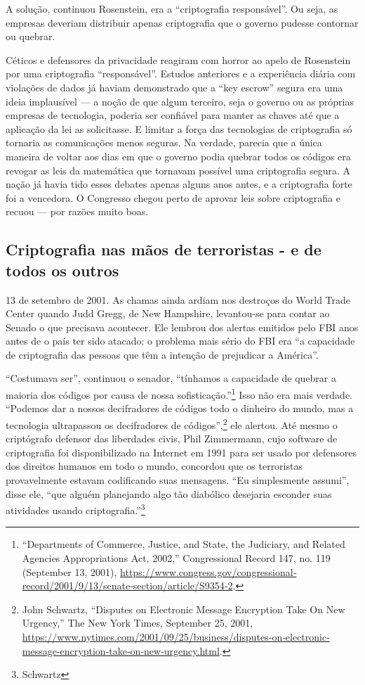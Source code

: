\documentclass{book}
\begin{document}
A solução, continuou Rosenstein, era a ``criptografia responsável''. Ou seja, as empresas deveriam distribuir apenas criptografia que o governo pudesse contornar ou quebrar.

Céticos e defensores da privacidade reagiram com horror ao apelo de Rosenstein por uma criptografia ``responsável''. Estudos anteriores e a experiência diária com violações de dados já haviam demonstrado que a ``key escrow'' segura era uma ideia implausível --- a noção de que algum terceiro, seja o governo ou as próprias empresas de tecnologia, poderia ser confiável para manter as chaves até que a aplicação da lei as solicitasse. E limitar a força das tecnologias de criptografia só tornaria as comunicações menos seguras. Na verdade, parecia que a única maneira de voltar aos dias em que o governo podia quebrar todos os códigos era revogar as leis da matemática que tornavam possível uma criptografia segura. A nação já havia tido esses debates apenas alguns anos antes, e a criptografia forte foi a vencedora. O Congresso chegou perto de aprovar leis sobre criptografia e recuou --- por razões muito boas.


\subsection{Criptografia nas mãos de terroristas - e de todos os outros}
\label{segredos:criptografia}

13 de setembro de 2001. As chamas ainda ardiam nos destroços do World Trade Center quando Judd Gregg, de New Hampshire, levantou-se para contar ao Senado o que precisava acontecer. Ele lembrou dos alertas emitidos pelo FBI anos antes de o país ter sido atacado: o problema mais sério do FBI era ``a capacidade de criptografia das pessoas que têm a intenção de prejudicar a América''.

``Costumava ser'', continuou o senador, ``tínhamos a capacidade de quebrar a maioria dos códigos por causa de nossa sofisticação.''\footnote{“Departments of Commerce, Justice, and State, the Judiciary, and Related Agencies Appropriations Act, 2002,” Congressional Record 147, no. 119 (September 13, 2001), \url{https://www.congress.gov/congressional‐record/2001/9/13/senate‐section/article/S9354‐2}.} Isso não era mais verdade. ``Podemos dar a nossos decifradores de códigos todo o dinheiro do mundo, mas a tecnologia ultrapassou os decifradores de códigos'',\footnote{John Schwartz, “Disputes on Electronic Message Encryption Take On New Urgency,” The New York Times, September 25, 2001, \url{https://www.nytimes.com/2001/09/25/business/disputes‐on‐electronic-message‐encryption‐take‐on‐new‐urgency.html}.} ele alertou. Até mesmo o criptógrafo defensor das liberdades civis, Phil Zimmermann, cujo software de criptografia foi disponibilizado na Internet em 1991 para ser usado por defensores dos direitos humanos em todo o mundo, concordou que os terroristas provavelmente estavam codificando suas mensagens. ``Eu simplesmente assumi'', disse ele, ``que alguém planejando algo tão diabólico desejaria esconder suas atividades usando criptografia.''\footnote{Schwartz}
\end{document}

